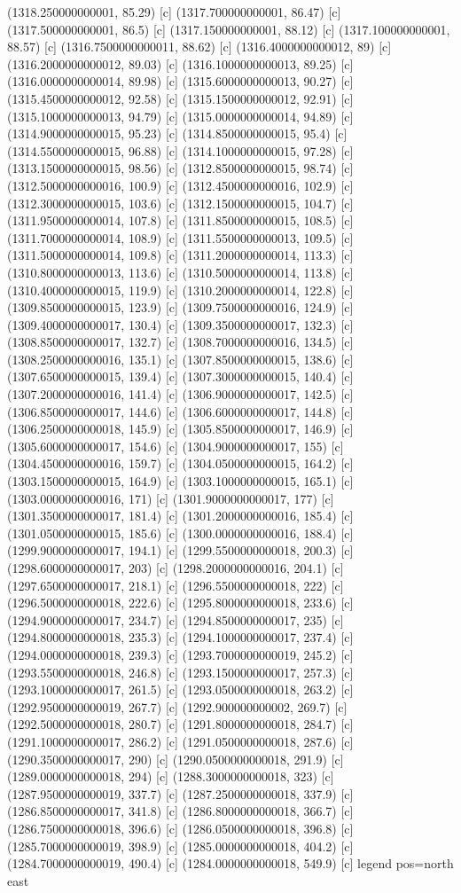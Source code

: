 {{{(1318.250000000001, 85.29) [c] 
(1317.700000000001, 86.47) [c] 
(1317.500000000001, 86.5) [c] 
(1317.150000000001, 88.12) [c] 
(1317.100000000001, 88.57) [c] 
(1316.7500000000011, 88.62) [c] 
(1316.4000000000012, 89) [c] 
(1316.2000000000012, 89.03) [c] 
(1316.1000000000013, 89.25) [c] 
(1316.0000000000014, 89.98) [c] 
(1315.6000000000013, 90.27) [c] 
(1315.4500000000012, 92.58) [c] 
(1315.1500000000012, 92.91) [c] 
(1315.1000000000013, 94.79) [c] 
(1315.0000000000014, 94.89) [c] 
(1314.9000000000015, 95.23) [c] 
(1314.8500000000015, 95.4) [c] 
(1314.5500000000015, 96.88) [c] 
(1314.1000000000015, 97.28) [c] 
(1313.1500000000015, 98.56) [c] 
(1312.8500000000015, 98.74) [c] 
(1312.5000000000016, 100.9) [c] 
(1312.4500000000016, 102.9) [c] 
(1312.3000000000015, 103.6) [c] 
(1312.1500000000015, 104.7) [c] 
(1311.9500000000014, 107.8) [c] 
(1311.8500000000015, 108.5) [c] 
(1311.7000000000014, 108.9) [c] 
(1311.5500000000013, 109.5) [c] 
(1311.5000000000014, 109.8) [c] 
(1311.2000000000014, 113.3) [c] 
(1310.8000000000013, 113.6) [c] 
(1310.5000000000014, 113.8) [c] 
(1310.4000000000015, 119.9) [c] 
(1310.2000000000014, 122.8) [c] 
(1309.8500000000015, 123.9) [c] 
(1309.7500000000016, 124.9) [c] 
(1309.4000000000017, 130.4) [c] 
(1309.3500000000017, 132.3) [c] 
(1308.8500000000017, 132.7) [c] 
(1308.7000000000016, 134.5) [c] 
(1308.2500000000016, 135.1) [c] 
(1307.8500000000015, 138.6) [c] 
(1307.6500000000015, 139.4) [c] 
(1307.3000000000015, 140.4) [c] 
(1307.2000000000016, 141.4) [c] 
(1306.9000000000017, 142.5) [c] 
(1306.8500000000017, 144.6) [c] 
(1306.6000000000017, 144.8) [c] 
(1306.2500000000018, 145.9) [c] 
(1305.8500000000017, 146.9) [c] 
(1305.6000000000017, 154.6) [c] 
(1304.9000000000017, 155) [c] 
(1304.4500000000016, 159.7) [c] 
(1304.0500000000015, 164.2) [c] 
(1303.1500000000015, 164.9) [c] 
(1303.1000000000015, 165.1) [c] 
(1303.0000000000016, 171) [c] 
(1301.9000000000017, 177) [c] 
(1301.3500000000017, 181.4) [c] 
(1301.2000000000016, 185.4) [c] 
(1301.0500000000015, 185.6) [c] 
(1300.0000000000016, 188.4) [c] 
(1299.9000000000017, 194.1) [c] 
(1299.5500000000018, 200.3) [c] 
(1298.6000000000017, 203) [c] 
(1298.2000000000016, 204.1) [c] 
(1297.6500000000017, 218.1) [c] 
(1296.5500000000018, 222) [c] 
(1296.5000000000018, 222.6) [c] 
(1295.8000000000018, 233.6) [c] 
(1294.9000000000017, 234.7) [c] 
(1294.8500000000017, 235) [c] 
(1294.8000000000018, 235.3) [c] 
(1294.1000000000017, 237.4) [c] 
(1294.0000000000018, 239.3) [c] 
(1293.7000000000019, 245.2) [c] 
(1293.5500000000018, 246.8) [c] 
(1293.1500000000017, 257.3) [c] 
(1293.1000000000017, 261.5) [c] 
(1293.0500000000018, 263.2) [c] 
(1292.9500000000019, 267.7) [c] 
(1292.900000000002, 269.7) [c] 
(1292.5000000000018, 280.7) [c] 
(1291.8000000000018, 284.7) [c] 
(1291.1000000000017, 286.2) [c] 
(1291.0500000000018, 287.6) [c] 
(1290.3500000000017, 290) [c] 
(1290.0500000000018, 291.9) [c] 
(1289.0000000000018, 294) [c] 
(1288.3000000000018, 323) [c] 
(1287.9500000000019, 337.7) [c] 
(1287.2500000000018, 337.9) [c] 
(1286.8500000000017, 341.8) [c] 
(1286.8000000000018, 366.7) [c] 
(1286.7500000000018, 396.6) [c] 
(1286.0500000000018, 396.8) [c] 
(1285.7000000000019, 398.9) [c] 
(1285.0000000000018, 404.2) [c] 
(1284.7000000000019, 490.4) [c] 
(1284.0000000000018, 549.9) [c] 
}}}{legend pos=north east}